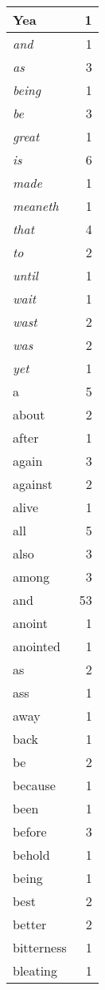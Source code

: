 \begin{center}
\begin{longtable}{l|r}
Yea & 1 \\ \hline
\emph{and} & 1 \\ \hline
\emph{as} & 3 \\ \hline
\emph{being} & 1 \\ \hline
\emph{be} & 3 \\ \hline
\emph{great} & 1 \\ \hline
\emph{is} & 6 \\ \hline
\emph{made} & 1 \\ \hline
\emph{meaneth} & 1 \\ \hline
\emph{that} & 4 \\ \hline
\emph{to} & 2 \\ \hline
\emph{until} & 1 \\ \hline
\emph{wait} & 1 \\ \hline
\emph{wast} & 2 \\ \hline
\emph{was} & 2 \\ \hline
\emph{yet} & 1 \\ \hline
a & 5 \\ \hline
about & 2 \\ \hline
after & 1 \\ \hline
again & 3 \\ \hline
against & 2 \\ \hline
alive & 1 \\ \hline
all & 5 \\ \hline
also & 3 \\ \hline
among & 3 \\ \hline
and & 53 \\ \hline
anoint & 1 \\ \hline
anointed & 1 \\ \hline
as & 2 \\ \hline
ass & 1 \\ \hline
away & 1 \\ \hline
back & 1 \\ \hline
be & 2 \\ \hline
because & 1 \\ \hline
been & 1 \\ \hline
before & 3 \\ \hline
behold & 1 \\ \hline
being & 1 \\ \hline
best & 2 \\ \hline
better & 2 \\ \hline
bitterness & 1 \\ \hline
bleating & 1 \\ \hline

\end{longtable}
\end{center}
